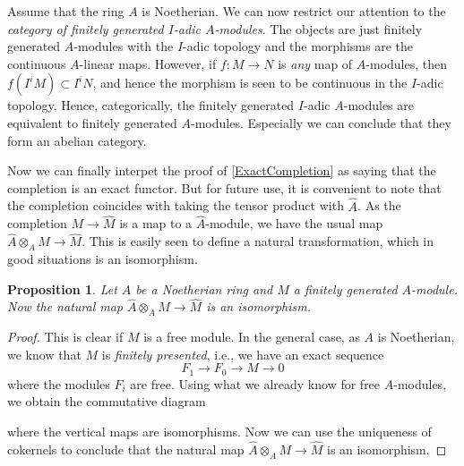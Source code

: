 \documentclass[12pt,a4paper,leqno]{article}
\newcommand{\fref}[1]{\hyperref[{#1}]{\ref*{#1}}}
\theoremstyle{plain}
\newtheorem{prop}[theo]{Proposition}
\theoremstyle{definition}
\theoremstyle{remark}
\begin{document}
Assume that the ring $A$ is Noetherian. We can now restrict our attention to the \emph{category of finitely generated $I$-adic $A$-modules}. The objects are just finitely generated $A$-modules with the $I$-adic topology and the morphisms are the continuous $A$-linear maps. However, if $f: M \to N$ is \emph{any} map of $A$-modules, then $f(I^iM) \subset I^i N$, and hence the morphism is seen to be continuous in the $I$-adic topology. Hence, categorically, the finitely generated $I$-adic $A$-modules are equivalent to finitely generated $A$-modules. Especially we can conclude that they form an abelian category.

Now we can finally interpet the proof of \fref{ExactCompletion} as saying that the completion is an exact functor. But for future use, it is convenient to note that the completion coincides with taking the tensor product with $\widehat A$. As the completion $M \to \widehat M$ is a map to a $\widehat A$-module, we have the usual map $\widehat A \otimes_A  M \to \widehat M$. This is easily seen to define a natural transformation, which in good situations is an isomorphism.

\begin{prop}
Let $A$ be a Noetherian ring and $M$ a finitely generated $A$-module. Now the natural map $\widehat A \otimes_A M \to \widehat M$ is an isomorphism.
\end{prop}
\begin{proof}
This is clear if $M$ is a free module. In the general case, as $A$ is Noetherian, we know that $M$ is \emph{finitely presented}, i.e., we have an exact sequence
\begin{equation*}
F_1 \to F_0 \to M \to 0
\end{equation*}
where the modules $F_i$ are free. Using what we already know for free $A$-modules, we obtain the commutative diagram
\begin{center}
\end{center}
where the vertical maps are isomorphisms. Now we can use the uniqueness of cokernels to conclude that the natural map $\widehat A \otimes_A M  \to \widehat{M}$ is an isomorphism.
\end{proof}
\end{document}

